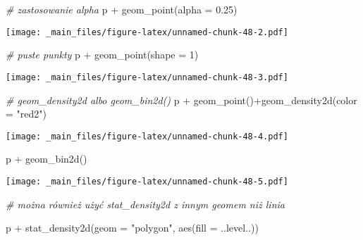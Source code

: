 \documentclass[
]{book}
\newenvironment{Shaded}{\begin{snugshade}}{\end{snugshade}}
\newcommand{\AttributeTok}[1]{\textcolor[rgb]{0.77,0.63,0.00}{#1}}
\newcommand{\CommentTok}[1]{\textcolor[rgb]{0.56,0.35,0.01}{\textit{#1}}}
\newcommand{\DecValTok}[1]{\textcolor[rgb]{0.00,0.00,0.81}{#1}}
\newcommand{\FloatTok}[1]{\textcolor[rgb]{0.00,0.00,0.81}{#1}}
\newcommand{\FunctionTok}[1]{\textcolor[rgb]{0.00,0.00,0.00}{#1}}
\newcommand{\NormalTok}[1]{#1}
\newcommand{\SpecialCharTok}[1]{\textcolor[rgb]{0.00,0.00,0.00}{#1}}
\newcommand{\StringTok}[1]{\textcolor[rgb]{0.31,0.60,0.02}{#1}}
\begin{document}
\begin{Shaded}
\begin{Highlighting}[]
\CommentTok{\# zastosowanie alpha}
\NormalTok{p }\SpecialCharTok{+} \FunctionTok{geom\_point}\NormalTok{(}\AttributeTok{alpha =} \FloatTok{0.25}\NormalTok{)}
\end{Highlighting}
\end{Shaded}

\texttt{[image: \_main\_files/figure-latex/unnamed-chunk-48-2.pdf]}

\begin{Shaded}
\begin{Highlighting}[]
\CommentTok{\# puste punkty}
\NormalTok{p }\SpecialCharTok{+} \FunctionTok{geom\_point}\NormalTok{(}\AttributeTok{shape =} \DecValTok{1}\NormalTok{)}
\end{Highlighting}
\end{Shaded}

\texttt{[image: \_main\_files/figure-latex/unnamed-chunk-48-3.pdf]}

\begin{Shaded}
\begin{Highlighting}[]
\CommentTok{\# geom\_density2d albo geom\_bin2d()}
\NormalTok{p }\SpecialCharTok{+} \FunctionTok{geom\_point}\NormalTok{()}\SpecialCharTok{+}\FunctionTok{geom\_density2d}\NormalTok{(}\AttributeTok{color =} \StringTok{"red2"}\NormalTok{)}
\end{Highlighting}
\end{Shaded}

\texttt{[image: \_main\_files/figure-latex/unnamed-chunk-48-4.pdf]}

\begin{Shaded}
\begin{Highlighting}[]
\NormalTok{p }\SpecialCharTok{+} \FunctionTok{geom\_bin2d}\NormalTok{()}
\end{Highlighting}
\end{Shaded}

\texttt{[image: \_main\_files/figure-latex/unnamed-chunk-48-5.pdf]}

\begin{Shaded}
\begin{Highlighting}[]
\CommentTok{\# można również użyć stat\_density2d z innym geomem niż linia}

\NormalTok{p }\SpecialCharTok{+} \FunctionTok{stat\_density2d}\NormalTok{(}\AttributeTok{geom =} \StringTok{"polygon"}\NormalTok{, }\FunctionTok{aes}\NormalTok{(}\AttributeTok{fill  =}\NormalTok{  ..level..))}
\end{Highlighting}
\end{Shaded}
\end{document}
